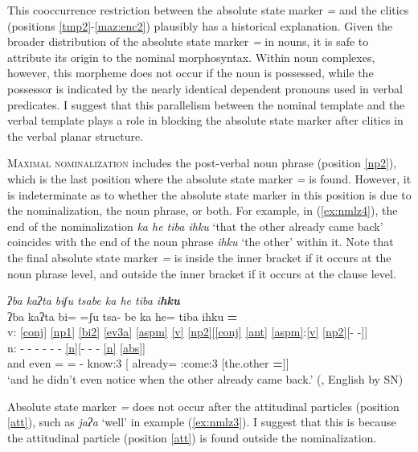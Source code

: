 \documentclass[output=paper]{langscibook}
\begin{document}
This cooccurrence restriction between the absolute state marker \textit{=\1} and the clitics (positions \ref{tmp2}-\ref{maz:enc2}) plausibly has a historical explanation. Given the broader distribution of the absolute state marker \textit{=\1} in nouns, it is safe to attribute its origin to the nominal morphosyntax. Within noun complexes, however, this morpheme does not occur if the noun is possessed, while the possessor is indicated by the nearly identical dependent pronouns used in verbal predicates. I suggest that this parallelism between the nominal template and the verbal template plays a role in blocking the absolute state marker after clitics in the verbal planar structure.

\textsc{Maximal nominalization} includes the post-verbal noun phrase (position \ref{np2}), which is the last position where the absolute state marker \textit{=\1} is found. However, it is indeterminate as to whether the absolute state marker in this position is due to the nominalization, the noun phrase, or both. For example, in (\ref{ex:nmlz4}), the end of the nominalization \textit{\ssn ka\2 he\2 \ssn ti\2ba\4 \xy i\2h\ssn ku\2\3\1} `that the other already came back' coincides with the end of the noun phrase \textit{\xy i\2h\ssn ku\2\3\1} `the other' within it. Note that the final absolute state marker \textit{=\1} is inside the inner bracket if it occurs at the noun phrase level, and outside the inner bracket if it occurs at the clause level.

\ea \label{ex:nmlz4}
 \textit{ʔba\1 ka\2ʔ\ssn ta\2 bi\4ʃu\3 tsa\2\st{}be\2\4 \ssn ka\2 he\2 \ssn ti\2\st{}ba\4 \xy i\2\textbf{\st{}h\ssn ku\2\3\1}}\\
\gllll {} ʔba\1 ka\2ʔ\ssn ta\2 bi\4= =ʃu\3\ff{} tsa\2- be\2\4 \ssn ka\2 he\2\ff= \ssn ti\2ba\4 \xy i\2h\ssn ku\2\3 \textbf{=\1}\\
v: \ref{conj} \ref{np1} \ref{bi2} \ref{ev3a} \ref{aspm} \ref{v} \ref{np2}[\ref{conj} \ref{ant} \ref{aspm}:\ref{v} \ref{np2}[- -]]\\
n: - - - - - - \ref{n}[- - - \ref{n} \ref{abs}]\\
{} and even \Neg= =\Rep{} \Pfv- know:3 [\Sub{} already= \Pfv:come:3 [the.other \textbf{=\Abst}]]\\
\glt `and he didn't even notice when the other already came back.'  (\citealt[132]{sanchez20}, English by SN)
\z

Absolute state marker \textit{=\1} does not occur after the attitudinal particles (position \ref{att}), such as \textit{ ja\2ʔa\2} `well' in example (\ref{ex:nmlz3}). I suggest that this is because the attitudinal particle (position \ref{att}) is found outside the nominalization.
\end{document}

